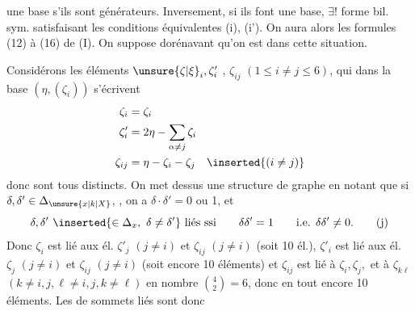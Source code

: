 une base s'ils sont générateurs. Inversement, si ils font une base, $\exists!$ forme bil. sym. satisfaisant les conditions équivalentes (i), (i'). On aura alors les formules (12) à (16) de (I). On suppose dorénavant qu'on est dans cette situation.

 Considérons les  éléments $\unsure{\zeta|\xi}_i,\zeta'_i$ , $\zeta_{ij}$ $(1\le i\ne j\le6)$, qui dans la base $(\eta,(\zeta_i))$ s'écrivent
\[
\begin{aligned}
\zeta_i&=\zeta_i\\
\zeta'_i&=2\eta-\sum_{\alpha\ne j}\zeta_i\\
\zeta_{ij}&=\eta-\zeta_i-\zeta_j\quad\inserted{(i\ne j)}
\end{aligned}
\]
donc sont tous distincts.  On met dessus une structure de graphe en notant  que si $\delta,\delta'\in\Delta_{\unsure{x|k|X}}$, , on a $\delta\cdot\delta'=0$ ou 1,  et  
\[
\delta,\delta'\ \inserted{\in\Delta_x,\ \delta\ne\delta'}\ \text{liés ssi}\qquad\delta\delta'=1\qquad\text{i.e. }\delta\delta'\ne0.\tag*{(j)}
\]
Donc $\zeta_i$ est lié aux él. $\zeta'_j$ $(j\ne i)$ et $\zeta_{ij}$ $(j\ne i)$  (soit 10 él.), $\zeta'_i$ est lié aux él. $\zeta_j$ $(j\ne i)$ et $\zeta_{ij}$ $(j\ne i)$  (soit encore 10 éléments) et $\zeta_{ij}$  est lié à $\zeta_i,\zeta_j,$  et à $\zeta_{k\ell}$ $(k\ne i,j,\ell\ne i,j,k\ne\ell)$ en nombre $\binom42=6$, donc en tout encore 10 éléments.  Les   de sommets liés sont donc
